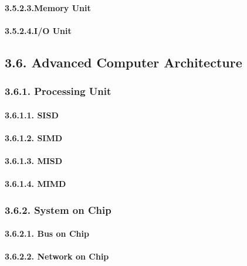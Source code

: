 \documentclass[]{article}
\let\oldparagraph\paragraph
\renewcommand{\paragraph}[1]{\oldparagraph{#1}\mbox{}}
\begin{document}
\paragraph{3.5.2.3.Memory Unit}\label{memory-unit-1}

\paragraph{3.5.2.4.I/O Unit}\label{io-unit-1}

\subsection{3.6. Advanced Computer
Architecture}\label{advanced-computer-architecture}

\subsubsection{3.6.1. Processing Unit}\label{processing-unit}

\paragraph{3.6.1.1. SISD}\label{sisd}

\paragraph{3.6.1.2. SIMD}\label{simd}

\paragraph{3.6.1.3. MISD}\label{misd}

\paragraph{3.6.1.4. MIMD}\label{mimd}

\subsubsection{3.6.2. System on Chip}\label{system-on-chip}

\paragraph{3.6.2.1. Bus on Chip}\label{bus-on-chip}

\paragraph{3.6.2.2. Network on Chip}\label{network-on-chip}
\end{document}

